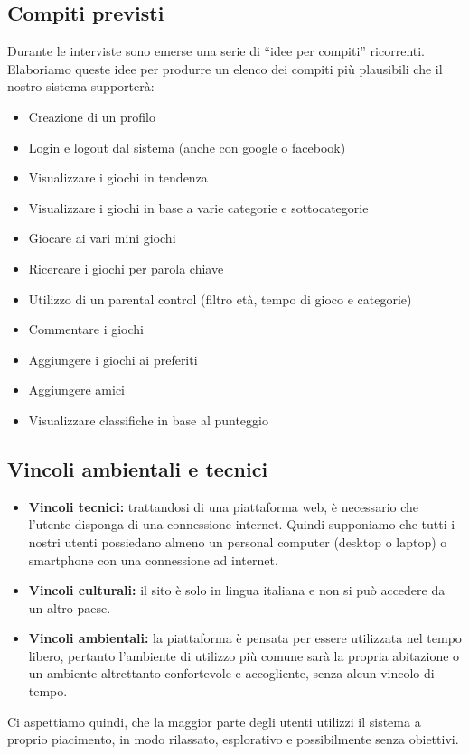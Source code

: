 \documentclass[../Report.tex]{subfiles}
\begin{document}
        \subsection{Compiti previsti}
        Durante le interviste sono emerse una serie di “idee per compiti” ricorrenti. Elaboriamo queste idee per produrre un elenco dei compiti più plausibili che il nostro sistema supporterà:
        \begin{itemize}
            \item Creazione di un profilo
            \item Login e logout dal sistema (anche con google o facebook)
            \item Visualizzare i giochi in tendenza
            \item Visualizzare i giochi in base a varie categorie e sottocategorie
            \item Giocare ai vari mini giochi
            \item Ricercare i giochi per parola chiave
            \item Utilizzo di un parental control (filtro età, tempo di gioco e categorie)
            \item Commentare i giochi
            \item Aggiungere i giochi ai preferiti
            \item Aggiungere amici
            \item Visualizzare classifiche in base al punteggio
        \end{itemize}

        \subsection{Vincoli ambientali e tecnici}
        \begin{itemize}
            \item \textbf{Vincoli tecnici:} trattandosi di una piattaforma web, è necessario che l'utente disponga di una connessione internet. Quindi supponiamo che tutti i nostri utenti possiedano almeno un personal computer (desktop o laptop) o smartphone con una connessione ad internet.
            \item \textbf{Vincoli culturali:} il sito è solo in lingua italiana e non si può accedere da un altro paese.
            \item \textbf{Vincoli ambientali:} la piattaforma è pensata per essere utilizzata nel tempo libero, pertanto l'ambiente di utilizzo più comune sarà la propria abitazione o un ambiente altrettanto confortevole e accogliente, senza alcun vincolo di tempo.
        \end{itemize}
        Ci aspettiamo quindi, che la maggior parte degli utenti utilizzi il sistema a proprio piacimento, in modo rilassato, esplorativo e possibilmente senza obiettivi.
\end{document}
